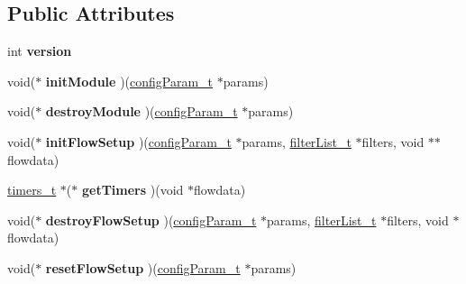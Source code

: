 \subsection*{Public Attributes}
\begin{DoxyCompactItemize}
\item 
\mbox{\label{structProcModuleInterface__t_acfd41eed5bbd3b6dd40cb9f4c3200259}} 
int {\bfseries version}
\item 
\mbox{\label{structProcModuleInterface__t_a52d61a61e5f9bc99302ad4391dd63320}} 
void($\ast$ {\bfseries init\+Module} )(\hyperlink{structconfigParam__t}{config\+Param\+\_\+t} $\ast$params)
\item 
\mbox{\label{structProcModuleInterface__t_a7e1fdbeabf56530af6704a3781470b77}} 
void($\ast$ {\bfseries destroy\+Module} )(\hyperlink{structconfigParam__t}{config\+Param\+\_\+t} $\ast$params)
\item 
\mbox{\label{structProcModuleInterface__t_a4cb210433fd498ddffff3514d801aeb7}} 
void($\ast$ {\bfseries init\+Flow\+Setup} )(\hyperlink{structconfigParam__t}{config\+Param\+\_\+t} $\ast$params, \hyperlink{ProcModuleInterface_8h_a2afc1e9fc63b2cfcd86ec2435f24e27c}{filter\+List\+\_\+t} $\ast$filters, void $\ast$$\ast$flowdata)
\item 
\mbox{\label{structProcModuleInterface__t_a938795aaa627bce229f93ee3c245ea4c}} 
\hyperlink{structtimers__t}{timers\+\_\+t} $\ast$($\ast$ {\bfseries get\+Timers} )(void $\ast$flowdata)
\item 
\mbox{\label{structProcModuleInterface__t_a4b64d61793632aa822155f5bc0a44c3b}} 
void($\ast$ {\bfseries destroy\+Flow\+Setup} )(\hyperlink{structconfigParam__t}{config\+Param\+\_\+t} $\ast$params, \hyperlink{ProcModuleInterface_8h_a2afc1e9fc63b2cfcd86ec2435f24e27c}{filter\+List\+\_\+t} $\ast$filters, void $\ast$flowdata)
\item 
\mbox{\label{structProcModuleInterface__t_afa248e185040d67ea5fd189c39ab02bf}} 
void($\ast$ {\bfseries reset\+Flow\+Setup} )(\hyperlink{structconfigParam__t}{config\+Param\+\_\+t} $\ast$params)
$$
\end{DoxyCompactItemize}
